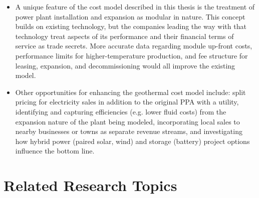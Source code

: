 \begin{itemize}
    \item A unique feature of the cost model described in this thesis is the treatment of power plant installation and expansion as modular in nature. This concept builds on existing technology, but the companies leading the way with that technology treat aspects of its performance and their financial terms of service as trade secrets. More accurate data regarding module up-front costs, performance limits for higher-temperature production, and fee structure for leasing, expansion, and decommissioning would all improve the existing model.
    \item Other opportunities for enhancing the geothermal cost model include: split pricing for electricity sales in addition to the original PPA with a utility, identifying and capturing efficiencies (e.g. lower fluid costs) from the expansion nature of the plant being modeled, incorporating local sales to nearby businesses or towns as separate revenue streams, and investigating how hybrid power (paired solar, wind) and storage (battery) project options influence the bottom line.
\end{itemize}

\section{Related Research Topics}
\label{ch9:future_work_related}

